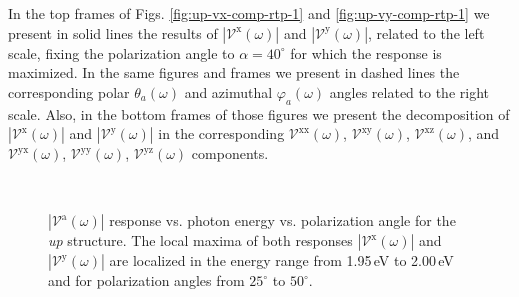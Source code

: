\documentclass[prb,11pt,tightenlines,twocolumn,aps]{revtex4-1}
\begin{document}
In the top frames of  Figs. \ref{fig:up-vx-comp-rtp-1} and 
% 
\ref{fig:up-vy-comp-rtp-1} we present in solid lines the results of
$|\mathcal{V}^{\mathrm{x}}(\omega)|$ and $|\mathcal{V}^{\mathrm{y}}(\omega)|$,
related to the left scale, fixing the polarization angle to $\alpha=40^{\circ}$
for which the response is maximized. In the same
figures and frames we present in dashed lines the corresponding polar
$\theta_{a}(\omega)$ and azimuthal $\varphi_{a}(\omega)$ angles related to the
right scale. Also, in the bottom frames of those figures we present the
decomposition of $|\mathcal{V}^{\mathrm{x}}(\omega)|$ and
$|\mathcal{V}^{\mathrm{y}}(\omega)|$ in the corresponding
$\mathcal{V}^{\mathrm{xx}}(\omega)$, $\mathcal{V}^{\mathrm{xy}}(\omega)$,
$\mathcal{V}^{\mathrm{xz}}(\omega)$, and $\mathcal{V}^{\mathrm{yx}}(\omega)$,
$\mathcal{V}^{\mathrm{yy}}(\omega)$, $\mathcal{V}^{\mathrm{yz}}(\omega)$
components.
\begin{figure}[t]
    \centering
    \\
    
    \caption{$|\mathcal{V}^{\mathrm{a}}(\omega)|$ response vs. photon energy vs.
    polarization angle for the \emph{up} structure. The local maxima of both
    responses $|\mathcal{V}^{\mathrm{x}}(\omega)|$ and
    $|\mathcal{V}^{\mathrm{y}}(\omega)|$ are localized in the energy range from
    1.95\,eV to 2.00\,eV and for polarization angles from $25^{\circ}$ to
    $50^{\circ}$.}
    \label{fig:up-3d-vva-2}
\end{figure}
\end{document}
